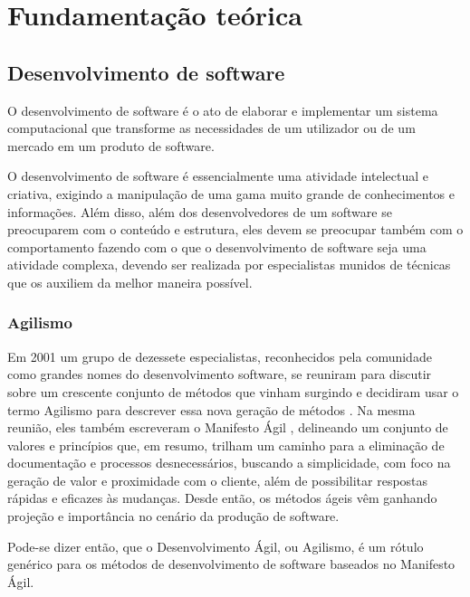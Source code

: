\chapter{Fundamentação teórica}

\section{Desenvolvimento de software}
\label{sec:desenvolvimento_de_software}

O desenvolvimento de software é o ato de elaborar e implementar um sistema computacional que transforme as necessidades de um utilizador ou de um mercado em um produto de software.

O desenvolvimento de software é essencialmente uma atividade intelectual e criativa, exigindo a manipulação de uma gama muito grande de conhecimentos e informações. Além disso, além dos desenvolvedores de um software se preocuparem com o conteúdo e estrutura, eles devem se preocupar também com o comportamento fazendo com o que o desenvolvimento de software seja uma atividade complexa, devendo ser realizada por especialistas munidos de técnicas que os auxiliem da melhor maneira possível.


\subsection{Agilismo}
\label{sub:agilismo}

Em 2001 um grupo de dezessete especialistas, reconhecidos pela comunidade como grandes nomes do desenvolvimento software, se reuniram para discutir sobre um crescente conjunto de métodos que vinham surgindo e decidiram usar o termo Agilismo para descrever essa nova geração de métodos \cite{AgileStory}. Na mesma reunião, eles também escreveram o Manifesto Ágil \cite{AgileManifesto}, delineando um conjunto de valores e princípios que, em resumo, trilham um caminho para a eliminação de documentação e processos desnecessários, buscando a simplicidade, com foco na geração de valor e proximidade com o cliente, além de possibilitar respostas rápidas e eficazes às mudanças. Desde então, os métodos ágeis vêm ganhando projeção e importância no cenário da produção de software.

Pode-se dizer então, que o Desenvolvimento Ágil, ou Agilismo, é um rótulo genérico para os métodos de desenvolvimento de software baseados no Manifesto Ágil.

